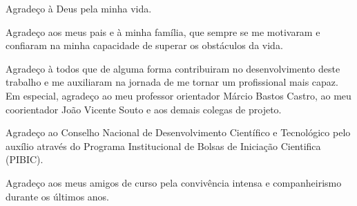 \begin{agradecimentos}
  Agradeço à Deus pela minha vida.
  
  Agradeço aos meus pais e à minha família, que sempre se me motivaram e confiaram na minha capacidade de superar os obstáculos da vida.
  
  Agradeço à todos que de alguma forma contribuiram no desenvolvimento deste trabalho e me auxiliaram na jornada de me tornar um profissional mais capaz. Em especial, agradeço ao meu professor orientador Márcio Bastos Castro, ao meu coorientador João Vicente Souto e aos demais colegas de projeto. 
  
  Agradeço ao Conselho Nacional de Desenvolvimento Científico e Tecnológico pelo auxílio através do Programa Institucional de Bolsas de Iniciação Cientifica (PIBIC).
  
  Agradeço aos meus amigos de curso pela convivência intensa e companheirismo durante os últimos anos.
  
\end{agradecimentos}
